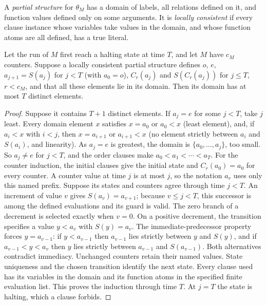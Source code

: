 A \emph{partial structure} for $\theta_M$ has a domain of labels, all relations defined on it, and
function values defined only on some arguments. It is \emph{locally consistent} if every clause
instance whose variables take values in the domain, and whose function atoms are all defined,
has a true literal.

\begin{lemma}\label{tx:lem:local-switch}
Let the run of $M$ first reach a halting state at time $T$, and let $M$ have $c_M$ counters.
Suppose a locally consistent partial structure defines $o$, $e$, $a_{j+1}=S(a_j)$ for $j<T$
\textup{(}with $a_0=o$\textup{)}, $C_r(a_j)$ and $S(C_r(a_j))$ for $j\le T$, $r<c_M$, and that all these
elements lie in its domain. Then its domain has at most $T$ distinct elements.
\end{lemma}
\begin{proof}
Suppose it contains $T+1$ distinct elements. If $a_j=e$ for some $j<T$, take $j$ least. Every
domain element $x$ satisfies $x=a_0$ or $a_0<x$ (least element), and, if $a_i<x$ with $i<j$, then
$x=a_{i+1}$ or $a_{i+1}<x$ (no element strictly between $a_i$ and $S(a_i)$, and linearity). As
$a_j=e$ is greatest, the domain is $\{a_0,\ldots,a_j\}$, too small. So $a_j\ne e$ for $j<T$, and
the order clauses make $a_0<a_1<\cdots<a_T$. For the counter induction, the initial clauses give the initial
state and $C_r(a_0)=a_0$ for every counter. A counter value at time $j$
is at most $j$, so the notation $a_v$ uses only this named prefix.
Suppose its states and counters agree through time $j<T$.
An increment of value $v$ gives $S(a_v)=a_{v+1}$; because $v\le j<T$,
this successor is among the defined evaluations and its guard is valid.
The zero branch of a decrement is selected exactly when $v=0$.
On a positive decrement, the transition specifies a value $y<a_v$
with $S(y)=a_v$. The immediate-predecessor property forces
$y=a_{v-1}$: if $y<a_{v-1}$ then $a_{v-1}$ lies strictly between
$y$ and $S(y)$, and if $a_{v-1}<y<a_v$ then $y$ lies strictly
between $a_{v-1}$ and $S(a_{v-1})$. Both alternatives contradict
immediacy. Unchanged counters retain their named values. State
uniqueness and the chosen transition identify the next state.
Every clause used has its variables in the domain and its function
atoms in the specified finite evaluation list. This proves the
induction through time $T$. At $j=T$ the state is halting, which a clause forbids.
\end{proof}

